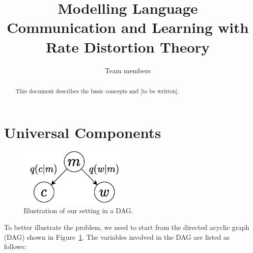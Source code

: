\documentclass[11pt]{article}
\title{Modelling Language Communication and Learning with \\ Rate Distortion Theory}
\author{Team members}
\date{}
\begin{document}
\maketitle
\begin{abstract}
  This document describes the basic concepts and [to be written].
\end{abstract}

\section{Universal Components}
\label{sec:uni_components}


\begin{figure}[h]
    \centering
    \includegraphics[width=0.49\textwidth]{docs/intro_rate_distortion/graphs/cog_comm_dag.pdf}
    \caption{Illustration of our setting in a DAG.}
    \label{fig:pipeline_dag}
\end{figure}

To better illustrate the problem, we need to start from the directed acyclic graph (DAG) shown in Figure~\ref{fig:pipeline_dag}.
The variables involved in the DAG are listed as follows:
\end{document}
